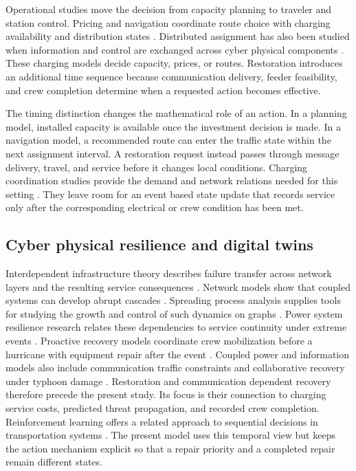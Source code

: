 \documentclass[journal]{IEEEtran}
\begin{document}
Operational studies move the decision from capacity planning to traveler and
station control.  Pricing and navigation coordinate route choice with charging
availability and distribution states \cite{cui2021pricing,li2024inverse,
ran2024fast}.  Distributed assignment has also been studied when information
and control are exchanged across cyber physical components
\cite{tao2024distributed}.  These charging models decide capacity, prices, or
routes.  Restoration introduces an additional time
sequence because communication delivery, feeder feasibility, and crew
completion determine when a requested action becomes effective.

The timing distinction changes the mathematical role of an action.  In a
planning model, installed capacity is available once the investment decision is
made.  In a navigation model, a recommended route can enter the traffic state
within the next assignment interval.  A restoration request instead passes
through message delivery, travel, and service before it changes local
conditions.  Charging coordination studies provide the demand and network
relations needed for this setting \cite{cui2021pricing,tao2024distributed}.
They leave room for an event based state update that records service only after
the corresponding electrical or crew condition has been met.

\subsection{Cyber physical resilience and digital twins}

Interdependent infrastructure theory describes failure transfer across network
layers and the resulting service consequences
\cite{rinaldi2001interdependencies,ouyang2014review}.  Network models show that
coupled systems can develop abrupt cascades \cite{buldyrev2010cascade}.
Spreading process analysis supplies tools for studying the growth and control of
such dynamics on graphs \cite{nowzari2016epidemics}.  Power system resilience
research relates these dependencies to service continuity under extreme events
\cite{panteli2015resilience}.  Proactive recovery models coordinate crew
mobilization before a hurricane with equipment repair after the event
\cite{arab2015proactive}.  Coupled power and information models also include
communication traffic constraints and collaborative recovery under typhoon
damage \cite{ti2022resilience}.  Restoration and communication dependent
recovery therefore precede the present study.  Its focus is their connection
to charging service costs, predicted threat propagation, and recorded crew
completion.  Reinforcement learning offers a related approach to
sequential decisions in transportation systems \cite{haydari2020rl}.  The present model uses
this temporal view but keeps the action mechanism explicit so that a repair
priority and a completed repair remain different states.
\end{document}
